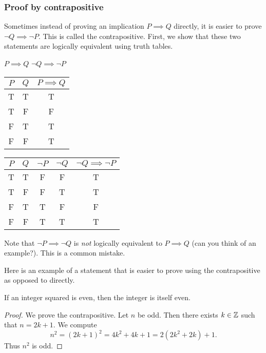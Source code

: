 \documentclass{article}
\begin{document}
\subsubsection{Proof by contrapositive}
Sometimes instead of proving an implication $P \implies Q$ directly, it is easier to prove $\neg Q \implies \neg P$. This is called the contrapositive. First, we show that these two statements are logically equivalent using truth tables. 

$P \implies Q$  \hspace{5cm}  $\neg Q \implies \neg P$

        \vspace{1em}
\begin{tabular}{|c|c| c|}
\hline
     $P$& $Q$ &  $P \implies Q$ \\ \hline
     T& T & T \\ \hline
     T & F & F \\ \hline
     F & T & T \\ \hline
     F & F & T \\ \hline
\end{tabular}   \hspace{2cm}  \begin{tabular}{|c | c | c |  c | c |}
\hline
     $P$& $Q$ & $\neg P$ &  $\neg Q$ & $\neg Q \implies \neg P$ \\ \hline
     T& T & F & F & T \\ \hline
     T & F & F &  T & T \\ \hline
     F & T &  T  & F & F \\ \hline
     F & F & T & T & T \\ \hline
\end{tabular}
\vspace{1.5em}

Note that $\neg P \implies \neg Q$ is \emph{not} logically equivalent to  $P \implies Q$ (can you think of an example?). This is a common mistake.

\vspace{1em}

Here is an example of a statement that is easier to prove using the contrapositive as opposed to directly.

\begin{example}
If an integer squared is even, then the integer is itself even.
\end{example}


\begin{proof}
We prove the contrapositive. Let $n$ be odd. Then there exists $k \in {\mathbb{Z}}$ such that $n = 2k + 1$. We compute
$$n^2 = (2k + 1)^2 = 4k^2 + 4k + 1 = 2(2k^2+2k) + 1.$$
Thus $n^2$ is odd.
\end{proof}
\end{document}
